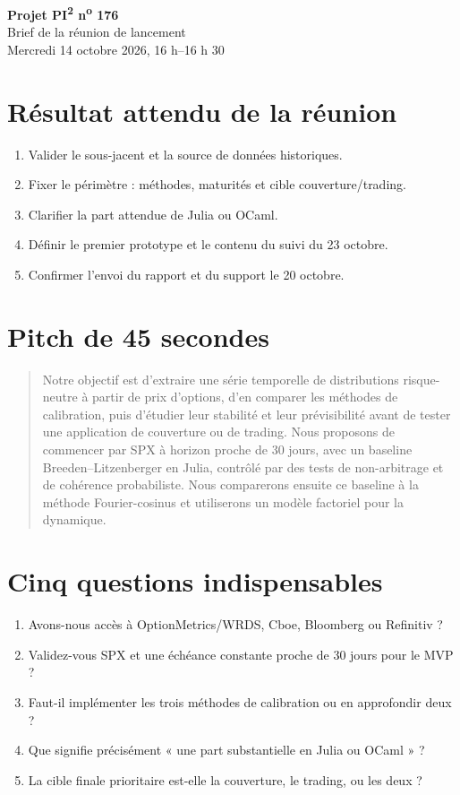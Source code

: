 \documentclass[11pt,a4paper]{article}
\begin{document}
\begin{center}
{\Large\bfseries\color{esilvblue} Projet PI\textsuperscript{2} n\textsuperscript{o} 176}\\[0.3em]
{\large Brief de la réunion de lancement}\\[0.2em]
Mercredi 14 octobre 2026, 16 h--16 h 30
\end{center}

\section*{Résultat attendu de la réunion}
\begin{enumerate}
  \item Valider le sous-jacent et la source de données historiques.
  \item Fixer le périmètre : méthodes, maturités et cible couverture/trading.
  \item Clarifier la part attendue de Julia ou OCaml.
  \item Définir le premier prototype et le contenu du suivi du 23 octobre.
  \item Confirmer l'envoi du rapport et du support le 20 octobre.
\end{enumerate}

\section*{Pitch de 45 secondes}
\begin{quote}
Notre objectif est d'extraire une série temporelle de distributions risque-neutre
à partir de prix d'options, d'en comparer les méthodes de calibration, puis d'étudier
leur stabilité et leur prévisibilité avant de tester une application de couverture
ou de trading. Nous proposons de commencer par SPX à horizon proche de 30 jours,
avec un baseline Breeden--Litzenberger en Julia, contrôlé par des tests de
non-arbitrage et de cohérence probabiliste. Nous comparerons ensuite ce baseline à
la méthode Fourier-cosinus et utiliserons un modèle factoriel pour la dynamique.
\end{quote}

\section*{Cinq questions indispensables}
\begin{enumerate}
  \item Avons-nous accès à OptionMetrics/WRDS, Cboe, Bloomberg ou Refinitiv ?
  \item Validez-vous SPX et une échéance constante proche de 30 jours pour le MVP ?
  \item Faut-il implémenter les trois méthodes de calibration ou en approfondir deux ?
  \item Que signifie précisément « une part substantielle en Julia ou OCaml » ?
  \item La cible finale prioritaire est-elle la couverture, le trading, ou les deux ?
\end{enumerate}
\end{document}
